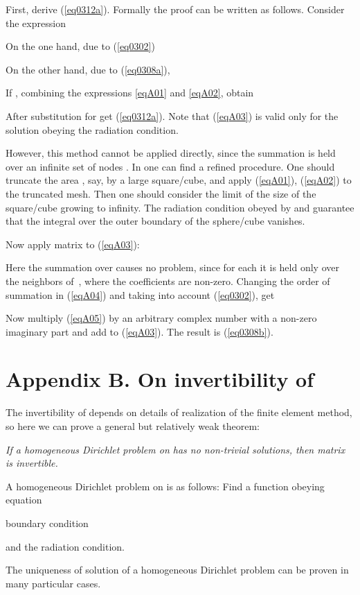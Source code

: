 \documentclass[12pt]{article}
\begin{document}
First, derive (\ref{eq0312a}). Formally the proof can be written as follows.
Consider the expression

On the one hand, due to (\ref{eq0302})

On the other hand, due to (\ref{eq0308a}),

If , combining the expressions \ref{eqA01} and \ref{eqA02}, obtain

After substitution   for  get (\ref{eq0312a}). Note that
(\ref{eqA03}) is valid only for the solution  obeying the radiation condition.

However, this method cannot be applied directly, since the
summation is held over an infinite set of nodes . In \cite{poblet-PVS:2014} one can find a refined procedure.
One should truncate the area , say, by a large square/cube, and apply (\ref{eqA01}), (\ref{eqA02}) to the truncated mesh. Then one should consider the limit of the size of the square/cube growing to infinity. The radiation condition obeyed by  and  guarantee that the integral over the outer boundary of the
sphere/cube vanishes.

Now apply matrix  to (\ref{eqA03}):

Here the summation over  causes no problem, since for each  it is held only over the neighbors of~,
where the coefficients  are non-zero.
Changing the order of summation in (\ref{eqA04}) and taking into account (\ref{eq0302}), get

Now multiply (\ref{eqA05}) by an arbitrary complex number  with a non-zero imaginary part and add to
(\ref{eqA03}). The result is (\ref{eq0308b}).




\section{Appendix B. On invertibility of }
\label{sec:AppB}

The invertibility of  depends on details of realization of the finite element method, so here we can prove
a general but relatively weak theorem:

{\em If a homogeneous Dirichlet problem on  has no non-trivial solutions, then matrix 
is invertible.}

A homogeneous Dirichlet problem on  is as follows: Find a function  obeying equation

boundary condition

and the radiation condition.

The uniqueness of solution of a homogeneous Dirichlet problem can be proven
in many particular cases.
\end{document}
